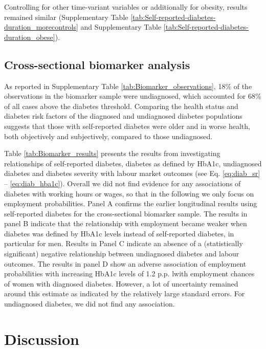 \documentclass[12pt,english]{article}
\begin{document}
Controlling for other time-variant variables or additionally for obesity, results remained similar (Supplementary Table \ref{tab:Self-reported-diabetes-duration_morecontrols} and Supplementary Table \ref{tab:Self-reported-diabetes-duration_obese}).



\FloatBarrier

\subsection{Cross-sectional biomarker analysis}


As reported in Supplementary Table \ref{tab:Biomarker_observations}, 18\% of the observations in the biomarker sample were undiagnosed, which accounted for 68\% of all cases above the diabetes threshold. Comparing the health status and diabetes risk factors of the diagnosed and undiagnosed diabetes populations suggests that those with self-reported diabetes were older and in worse health, both objectively and subjectively, compared to those undiagnosed.

Table \ref{tab:Biomarker_results} presents the results from investigating relationships of self-reported diabetes, diabetes as defined by \ac{HbA1c}, undiagnosed diabetes and diabetes severity with labour market outcomes (see Eq. \ref{eq:diab_sr} -- \ref{eq:diab_hba1c}). Overall we did not find evidence for any associations of diabetes with working hours or wages, so that in the following we only focus on employment probabilities. Panel A confirms the earlier longitudinal results using self-reported diabetes for the cross-sectional biomarker sample. The results in panel B indicate that the relationship with employment became weaker when diabetes was defined by \ac{HbA1c} levels instead of self-reported diabetes, in particular for men. Results in Panel C indicate an absence of a (statistically significant) negative relationship between undiagnosed diabetes and labour outcomes. The results in panel D show an adverse association of employment probabilities with increasing \ac{HbA1c} levels of 1.2 p.p. lwith employment chances of women with diagnosed diabetes. However, a lot of uncertainty remained around this estimate as indicated by the relatively large standard errors. For undiagnosed diabetes, we did not find any association.


\FloatBarrier

\section{\label{sec:cha_4_conclusion}Discussion}
\end{document}
